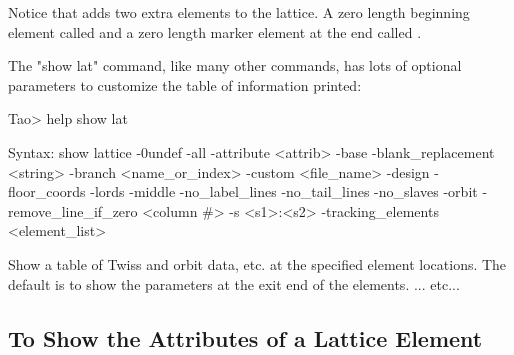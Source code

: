 \documentclass{hitec}
\begin{document}
Notice that \bmad adds two extra elements to the lattice. A zero length beginning element called 
and a zero length marker element at the end called .

The "show lat" command, like many other commands, has lots of optional parameters to customize the
table of information printed:

\begin{code}
Tao> help show lat

Syntax:
  show lattice {-0undef} {-all} {-attribute <attrib>} {-base}
      {-blank_replacement <string>}  {-branch <name_or_index>}
      {-custom <file_name>} {-design} {-floor_coords} {-lords} {-middle}
      {-no_label_lines} {-no_tail_lines} {-no_slaves} {-orbit} 
      {-remove_line_if_zero <column #>} {-s <s1>:<s2>} {-tracking_elements}
      {<element_list>}

Show a table of Twiss and orbit data, etc. at the specified element locations. 
The default is to show the parameters at the exit end of the elements. 
... etc...
\end{code}

\newpage

\subsection{To Show the Attributes of a Lattice Element}
\end{document}
